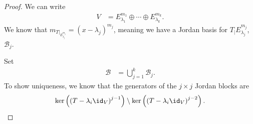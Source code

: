 \documentclass[10pt]{mypackage}
\begin{document}
\begin{proof}
  We can write
  \begin{align*}
    V &= E_{\lambda_1}^{m_1}\oplus\cdots\oplus E_{\lambda_k}^{m_k}.
  \end{align*}
  We know that $\displaystyle m_{T|_{E_{\lambda_j}^{m_j}}} = \left(x-\lambda_j\right)^{m_j}$, meaning we have a Jordan basis for $\displaystyle T_|{E_{\lambda_j}^{m_j}}$, $\mathcal{B}_j$.\newline

  Set
  \begin{align*}
    \mathcal{B} &= \bigcup_{j=1}^{k}\mathcal{B}_j.
  \end{align*}
  To show uniqueness, we know that the generators of the $j\times j$ Jordan blocks are
  \begin{align*}
    \ker\left(\left(T-\lambda_i\id_V\right)^{j-1}\right)\setminus \ker\left(\left(T-\lambda_i\id_V\right)^{j-2}\right).
  \end{align*}
\end{proof}
\end{document}
